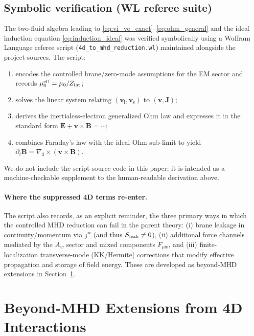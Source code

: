 \documentclass[11pt]{article}
\newcommand{\gradthree}{\nabla_3}
\newcommand{\ion}{\mathrm{i}}
\newcommand{\ele}{\mathrm{e}}
\newcommand{\E}{\mathbf{E}}
\newcommand{\B}{\mathbf{B}}
\newcommand{\Jb}{\mathbf{J}}
\newcommand{\Sleak}{S_{\rm leak}}
\newcommand{\Zint}{Z_{\rm int}}
\begin{document}
\subsection{Symbolic verification (WL referee suite)}
\label{sec:wl_verification}

The two-fluid algebra leading to \eqref{eq:vi_ve_exact}--\eqref{eq:ohm_general} and the
ideal induction equation \eqref{eq:induction_ideal} was verified symbolically using a
Wolfram Language referee script (\texttt{4d\_to\_mhd\_reduction.wl}) maintained alongside
the project sources. The script:
\begin{enumerate}[leftmargin=1.6em]
\item encodes the controlled brane/zero-mode assumptions for the EM sector and records
\(\mu_0^{\rm eff}=\mu_0/\Zint\);
\item solves the linear system relating \((\mathbf{v}_\ion,\mathbf{v}_\ele)\) to
\((\mathbf{v},\Jb)\);
\item derives the inertialess-electron generalized Ohm law and expresses it in the
standard form \(\E+\mathbf{v}\times\B=\cdots\);
\item combines Faraday's law with the ideal Ohm sub-limit to yield
\(\partial_t\B=\gradthree\times(\mathbf{v}\times\B)\).
\end{enumerate}
We do not include the script source code in this paper; it is intended as a
machine-checkable supplement to the human-readable derivation above.

\paragraph{Where the suppressed 4D terms re-enter.}
The script also records, as an explicit reminder, the three primary ways in which the
controlled MHD reduction can fail in the parent theory:
(i) brane leakage in continuity/momentum via \(j^w\) (and thus \(\Sleak\neq 0\)),
(ii) additional force channels mediated by the \(A_w\) sector and mixed components
\(F_{\mu w}\), and (iii) finite-localization transverse-mode (KK/Hermite) corrections that
modify effective propagation and storage of field energy. These are developed as beyond-MHD
extensions in Section~\ref{sec:beyond_mhd}.

\section{Beyond-MHD Extensions from 4D Interactions}
\label{sec:beyond_mhd}
\end{document}
